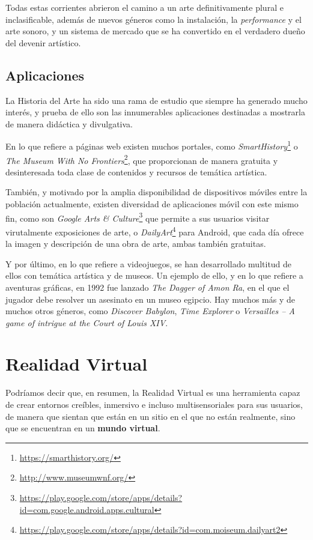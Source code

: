 Todas estas corrientes abrieron el camino a un arte definitivamente plural e inclasificable, además de nuevos géneros como la instalación, la \textit{performance} y el arte sonoro, y un sistema de mercado que se ha convertido en el verdadero dueño del devenir artístico.

\subsection{Aplicaciones}

La Historia del Arte ha sido una rama de estudio que siempre ha generado mucho interés, y prueba de ello son las innumerables aplicaciones destinadas a mostrarla de manera didáctica y divulgativa.

En lo que refiere a páginas web existen muchos portales, como \textit{SmartHistory}\footnote{\url{https://smarthistory.org/}} o \textit{The Museum With No Frontiers}\footnote{\url{http://www.museumwnf.org/}}, que proporcionan de manera gratuita y desinteresada toda clase de contenidos y recursos de temática artística.

También, y motivado por la amplia disponibilidad de dispositivos móviles entre la población actualmente, existen diversidad de aplicaciones móvil con este mismo fin, como son \textit{Google Arts \& Culture}\footnote{\url{https://play.google.com/store/apps/details?id=com.google.android.apps.cultural}} que permite a sus usuarios visitar virutalmente exposiciones de arte, o \textit{DailyArt}\footnote{\url{https://play.google.com/store/apps/details?id=com.moiseum.dailyart2}} para Android, que cada día ofrece la imagen y descripción de una obra de arte, ambas también gratuitas.

Y por último, en lo que refiere a videojuegos, se han desarrollado multitud de ellos con temática artística y de museos. Un ejemplo de ello, y en lo que refiere a aventuras gráficas, en 1992 fue lanzado \textit{The Dagger of Amon Ra}, en el que el jugador debe resolver un asesinato en un museo egipcio. Hay muchos más y de muchos otros géneros, como \textit{Discover Babylon}, \textit{Time Explorer} o \textit{Versailles – A game of intrigue at the Court of Louis XIV}.

\section{Realidad Virtual}

Podríamos decir que, en resumen, la Realidad Virtual es una herramienta capaz de crear entornos creíbles, inmersivo e incluso multisensoriales para sus usuarios, de manera que sientan que están en un sitio en el que no están realmente, sino que se encuentran en un \textbf{mundo virtual}.

